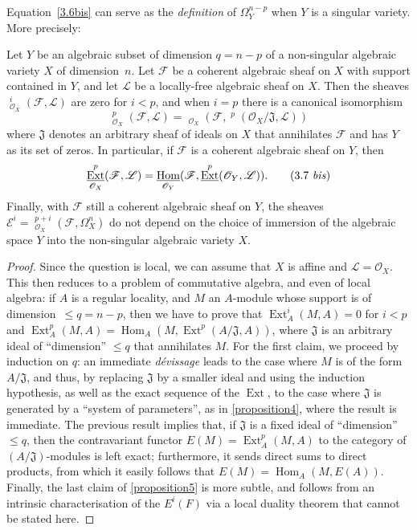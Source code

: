 \documentclass{article}
\theoremstyle{plain}
\newenvironment{proposition}[1]
  {\renewcommand\theinnercustomproposition{#1}\innercustomproposition}
  {\endinnercustomproposition}
\theoremstyle{definition}
\newcommand{\sh}[1]{{\mathscr{#1}}}
\renewcommand{\leq}{\leqslant}
\DeclareMathOperator{\Ext}{Ext}
\DeclareMathOperator{\Hom}{Hom}
\DeclareMathOperator{\shExt}{\underline{Ext}}
\DeclareMathOperator{\shHom}{\underline{Hom}}
\newcommand{\oldpage}[1]{\marginpar{\footnotesize$\Big\vert$ \textit{p.~#1}}}
\begin{document}
Equation~\cref{3.6bis} can serve as the \emph{definition} of $\Omega_Y^{n-p}$ when $Y$ is a singular variety.
More precisely:

\begin{proposition}{5}
\label{proposition5}
  Let $Y$ be an algebraic subset of dimension $q=n-p$ of a non-singular algebraic variety $X$ of dimension~$n$.
  Let $\sh{F}$ be a coherent algebraic sheaf on $X$ with support contained in $Y$, and let $\sh{L}$ be a locally-free algebraic sheaf on $X$.
  Then the sheaves $\shExt_{\sh{O}_X}^i(\sh{F},\sh{L})$ are zero for $i<p$, and when $i=p$ there is a canonical isomorphism
  \[
  \label{3.7}
    \shExt_{\sh{O}_X}^p(\sh{F},\sh{L}) = \shHom_{\sh{O}_X}(\sh{F},\shExt^p(\sh{O}_X/\mathfrak{J},\sh{L}))
  \tag{3.7}
  \]
  where $\mathfrak{J}$ denotes an arbitrary sheaf of ideals on $X$ that annihilates $\sh{F}$ and has $Y$ as its set of zeros.
  In particular, if $\sh{F}$ is a coherent algebraic sheaf on $Y$, then
  \[
  \label{3.7bis}
    \shExt_{\sh{O}_X}^p(\sh{F},\sh{L}) = \shHom_{\sh{O}_Y}(\sh{F},\shExt^p(\sh{O}_Y,\sh{L})).
  \tag{3.7 \emph{bis}}
  \]
  Finally, with $\sh{F}$ still a coherent algebraic sheaf on $Y$, the sheaves $\sh{E}^i=\shExt_{\sh{O}_X}^{p+i}(\sh{F},\Omega_X^n)$ do not depend on the choice of immersion of the algebraic space $Y$ into the non-singular algebraic variety $X$.
\end{proposition}

\begin{proof}
  Since the question is local, we can assume that $X$ is affine and $\sh{L}=\sh{O}_X$.
  This then reduces to a problem of commutative algebra, and even of local algebra:
  if $A$ is a regular locality, and $M$ an $A$-module whose support is of dimension~$\leq q=n-p$, then we have to prove that $\Ext_A^i(M,A)=0$ for $i<p$ and $\Ext_A^p(M,A)=\Hom_A(M,\Ext^p(A/\mathfrak{J},A))$, where $\mathfrak{J}$ is an arbitrary ideal of ``dimension'' $\leq q$ that annihilates $M$.
  For the first claim, we proceed by induction on $q$:
  an immediate \emph{d\'{e}vissage} leads to the case where $M$ is of the form $A/\mathfrak{J}$, and thus, by replacing $\mathfrak{J}$ by a smaller ideal and using the induction hypothesis, as well as the exact sequence of the $\Ext$, to the case where $\mathfrak{J}$ is generated by a ``system of parameters'', as in \cref{proposition4}, where the result is immediate.
  The previous result implies that, if $\mathfrak{J}$ is a
\oldpage{149-09}
  fixed ideal of ``dimension'' $\leq q$, then the contravariant functor $E(M)=\Ext_A^p(M,A)$ to the category of $(A/\mathfrak{J})$-modules is left exact;
  furthermore, it sends direct sums to direct products, from which it easily follows that $E(M)=\Hom_A(M,E(A))$.
  Finally, the last claim of \cref{proposition5} is more subtle, and follows from an intrinsic characterisation of the $E^i(F)$ via a local duality theorem that cannot be stated here.
\end{proof}
\end{document}
